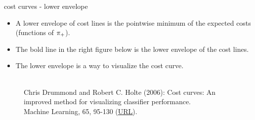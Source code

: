\begin{vbframe}{cost curves - lower envelope}
	
	\begin{itemize}
		\item A lower envelope of cost lines is the pointwise minimum of the expected costs (functions of $\pi_{+}$).
		\item The bold line in the right figure below is the lower envelope of the cost lines.
		\item The lower envelope is a way to visualize the cost curve.
	\end{itemize}
	\begin{figure}
		\centering
		\tiny
		\\Chris Drummond and Robert C. Holte (2006): Cost curves: An improved
		method for visualizing classifier performance. \\Machine Learning, 65, 95-130
		(\href{https://www.semanticscholar.org/paper/Cost-curves\%3A-An-improved-method-for  -visualizing-Drummond-Holte/71708ce984e0896e7383435913547e770572410e}
		{\underline{URL}}).
	\end{figure}
\end{vbframe}



